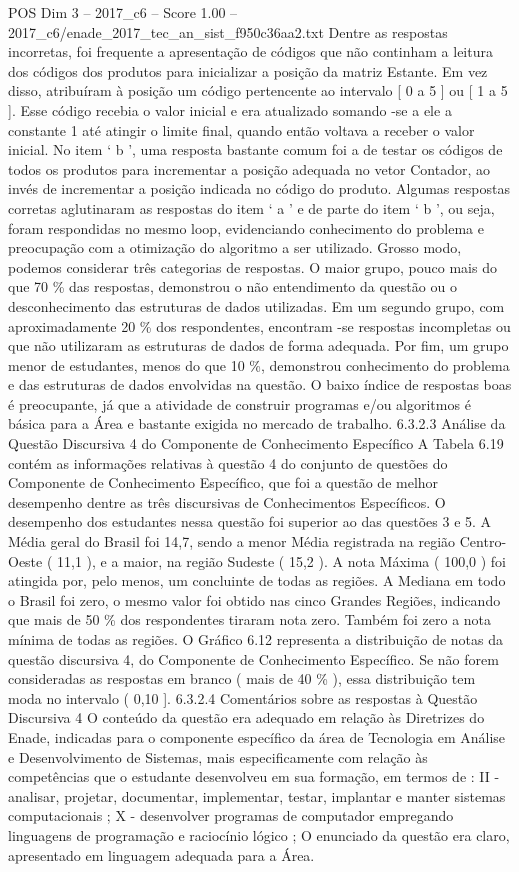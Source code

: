 \begin{textsample}{POS Dim 3 – 2017\_c6 – Score 1.00 – 2017\_c6/enade\_2017\_tec\_an\_sist\_f950c36aa2.txt}
Dentre as respostas incorretas, foi frequente a apresentação de códigos que não continham a leitura dos códigos dos produtos para inicializar a posição da matriz Estante.
Em vez disso, atribuíram à posição um código pertencente ao intervalo [ 0 a 5 ] ou [ 1 a 5 ].
Esse código recebia o valor inicial e era atualizado somando -se a ele a constante 1 até atingir o limite final, quando então voltava a receber o valor inicial.
No item ‘ b ’, uma resposta bastante comum foi a de testar os códigos de todos os produtos para incrementar a posição adequada no vetor Contador, ao invés de incrementar a posição indicada no código do produto.
Algumas respostas corretas aglutinaram as respostas do item ‘ a ’ e de parte do item ‘ b ’, ou seja, foram respondidas no mesmo loop, evidenciando conhecimento do problema e preocupação com a otimização do algoritmo a ser utilizado.
Grosso modo, podemos considerar três categorias de respostas.
O maior grupo, pouco mais do que 70 \% das respostas, demonstrou o não entendimento da questão ou o desconhecimento das estruturas de dados utilizadas.
Em um segundo grupo, com aproximadamente 20 \% dos respondentes, encontram -se respostas incompletas ou que não utilizaram as estruturas de dados de forma adequada.
Por fim, um grupo menor de estudantes, menos do que 10 \%, demonstrou conhecimento do problema e das estruturas de dados envolvidas na questão.
O baixo índice de respostas boas é preocupante, já que a atividade de construir programas e/ou algoritmos é básica para a Área e bastante exigida no mercado de trabalho. 6.3.2.3 Análise da Questão Discursiva 4 do Componente de Conhecimento Específico A Tabela 6.19 contém as informações relativas à questão 4 do conjunto de questões do Componente de Conhecimento Específico, que foi a questão de melhor desempenho dentre as três discursivas de Conhecimentos Específicos.
O desempenho dos estudantes nessa questão foi superior ao das questões 3 e 5.
A Média geral do Brasil foi 14,7, sendo a menor Média registrada na região Centro-Oeste ( 11,1 ), e a maior, na região Sudeste ( 15,2 ).
A nota Máxima ( 100,0 ) foi atingida por, pelo menos, um concluinte de todas as regiões.
A Mediana em todo o Brasil foi zero, o mesmo valor foi obtido nas cinco Grandes Regiões, indicando que mais de 50 \% dos respondentes tiraram nota zero.
Também foi zero a nota mínima de todas as regiões.
O Gráfico 6.12 representa a distribuição de notas da questão discursiva 4, do Componente de Conhecimento Específico.
Se não forem consideradas as respostas em branco ( mais de 40 \% ), essa distribuição tem moda no intervalo ( 0,10 ]. 6.3.2.4 Comentários sobre as respostas à Questão Discursiva 4 O conteúdo da questão era adequado em relação às Diretrizes do Enade, indicadas para o componente específico da área de Tecnologia em Análise e Desenvolvimento de Sistemas, mais especificamente com relação às competências que o estudante desenvolveu em sua formação, em termos de : II - analisar, projetar, documentar, implementar, testar, implantar e manter sistemas computacionais ; X - desenvolver programas de computador empregando linguagens de programação e raciocínio lógico ; O enunciado da questão era claro, apresentado em linguagem adequada para a Área.

\end{textsample}
